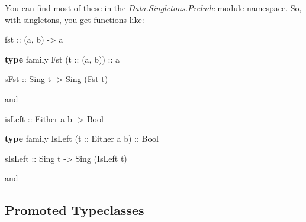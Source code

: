 \documentclass[]{article}
\newenvironment{Shaded}{}{}
\newcommand{\DataTypeTok}[1]{\textcolor[rgb]{0.56,0.13,0.00}{#1}}
\newcommand{\FunctionTok}[1]{\textcolor[rgb]{0.02,0.16,0.49}{#1}}
\newcommand{\KeywordTok}[1]{\textcolor[rgb]{0.00,0.44,0.13}{\textbf{#1}}}
\newcommand{\NormalTok}[1]{#1}
\newcommand{\OtherTok}[1]{\textcolor[rgb]{0.00,0.44,0.13}{#1}}
\begin{document}
You can find most of these in the \emph{Data.Singletons.Prelude} module
namespace. So, with singletons, you get functions like:

\begin{Shaded}
\begin{Highlighting}[]
\NormalTok{fst}\OtherTok{ ::}\NormalTok{ (a, b) }\OtherTok{->}\NormalTok{ a}

\KeywordTok{type}\NormalTok{ family }\DataTypeTok{Fst}\NormalTok{ (}\OtherTok{t ::}\NormalTok{ (a, b))}\OtherTok{ ::}\NormalTok{ a}

\OtherTok{sFst ::} \DataTypeTok{Sing}\NormalTok{ t }\OtherTok{->} \DataTypeTok{Sing}\NormalTok{ (}\DataTypeTok{Fst}\NormalTok{ t)}
\end{Highlighting}
\end{Shaded}

and

\begin{Shaded}
\begin{Highlighting}[]
\OtherTok{isLeft ::} \DataTypeTok{Either}\NormalTok{ a b }\OtherTok{->} \DataTypeTok{Bool}

\KeywordTok{type}\NormalTok{ family }\DataTypeTok{IsLeft}\NormalTok{ (}\OtherTok{t ::} \DataTypeTok{Either}\NormalTok{ a b)}\OtherTok{ ::} \DataTypeTok{Bool}

\OtherTok{sIsLeft ::} \DataTypeTok{Sing}\NormalTok{ t }\OtherTok{->} \DataTypeTok{Sing}\NormalTok{ (}\DataTypeTok{IsLeft}\NormalTok{ t)}
\end{Highlighting}
\end{Shaded}

and

\begin{Shaded}
\end{Shaded}

\hypertarget{promoted-typeclasses}{%
\subsection{Promoted Typeclasses}\label{promoted-typeclasses}}
\end{document}

